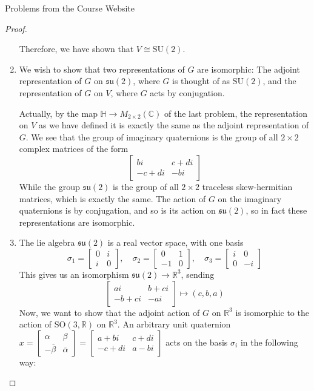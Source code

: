 \documentclass[12pt]{article}
\newcommand{\R}{\mathbb{R}}
\newcommand{\C}{\mathbb{C}}
\theoremstyle{definition}
\newenvironment{problem}[2][Problem]{\begin{trivlist}
\item[\hskip \labelsep {\bfseries #1}\hskip \labelsep {\bfseries #2.}]}{\end{trivlist}}
\begin{document}
\begin{section}{Problems from the Course Website}
\begin{problem}{3}
\begin{proof}
\begin{enumerate}[label=(\alph*)]
				\par Therefore, we have shown that $V \cong \text{SU}(2)$.
				\item We wish to show that two representations of $G$ are isomorphic: The adjoint representation of $G$ on $\mathfrak{su}(2)$, where $G$ is thought of as $\text{SU}(2)$, and the representation of $G$ on $V$, where $G$ acts by conjugation.
				\par Actually, by the map $\mathbb H \to M_{2 \times 2}(\C)$ of the last problem, the representation on $V$ as we have defined it is exactly the same as the adjoint representation of $G$. We see that the group of imaginary quaternions is the group of all $2\times 2$ complex matrices of the form
				\[
				\begin{bmatrix}
				bi & c + di\\
				-c + di & -bi
				\end{bmatrix}
				\]
				While the group $\mathfrak{su}(2)$ is the group of all $2\times 2$ traceless skew-hermitian matrices, which is exactly the same. The action of $G$ on the imaginary quaternions is by conjugation, and so is its action on $\mathfrak{su}(2)$, so in fact these representations are isomorphic.
				\item The lie algebra $\mathfrak{su}(2)$ is a real vector space, with one basis
				\[
				\sigma_1 = \begin{bmatrix}0 & i \\ i & 0 \end{bmatrix}, \quad \sigma_2 = \begin{bmatrix} 0 & 1 \\ -1 & 0 \end{bmatrix}, \quad \sigma_3 = \begin{bmatrix} i & 0 \\0 & -i\end{bmatrix}
				\]
				This gives us an isomorphism $\mathfrak{su}(2) \to \R^3$, sending
				\[
				\begin{bmatrix}
				ai & b + ci \\-b + ci & -ai
				\end{bmatrix} \mapsto (c,b,a)
				\]
				Now, we want to show that the adjoint action of $G$ on $\R^3$ is isomorphic to the action of $\text{SO}(3,\R)$ on $\R^3$. An arbitrary unit quaternion $x = \begin{bmatrix} \alpha & \beta \\ -\overline \beta & \overline \alpha \end{bmatrix} = \begin{bmatrix} a + bi & c + di \\ -c + di & a - bi \end{bmatrix} $ acts on the basis $\sigma_i$ in the following way:

\end{enumerate}
\end{proof}
\end{problem}
\end{section}
\end{document}
